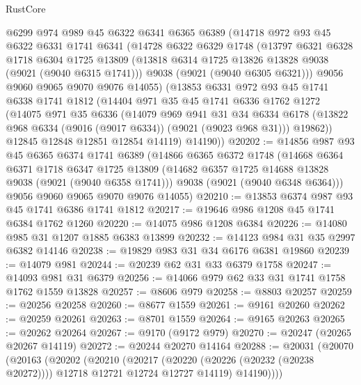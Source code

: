 \begin{lexlean}{RustCore}
\begin{coremodule}
    @6299
    @974
    @989
    @45
    @6322
    @6341
    @6365
    @6389
    (@14718
      @972
      @93
      @45
      @6322
      @6331
      @1741
      @6341
      (@14728
        @6322
        @6329
        @1748
        (@13797
          @6321
          @6328
          @1718
          @6304
          @1725
          @13809
          (@13818 @6314 @1725 @13826 @13828 @9038 (@9021 (@9040 @6315 @1741)))
          @9038
          (@9021 (@9040 @6305 @6321)))
        @9056
        @9060
        @9065
        @9070
        @9076
        @14055)
      (@13853
        @6331
        @972
        @93
        @45
        @1741
        @6338
        @1741
        @1812
        (@14404
          @971
          @35
          @45
          @1741
          @6336
          @1762
          @1272
          (@14075
            @971
            @35
            @6336
            (@14079
              @969
              @941
              @31
              @34
              @6334
              @6178
              (@13822 @968 @6334 (@9016 (@9017 @6334)) (@9021 (@9023 @968 @31)))
              @19862))
          @12845
          @12848
          @12851
          @12854
          @14119)
        @14190))
@20202 := @14856
    @987
    @93
    @45
    @6365
    @6374
    @1741
    @6389
    (@14866
      @6365
      @6372
      @1748
      (@14668
        @6364
        @6371
        @1718
        @6347
        @1725
        @13809
        (@14682 @6357 @1725 @14688 @13828 @9038 (@9021 (@9040 @6358 @1741)))
        @9038
        (@9021 (@9040 @6348 @6364)))
      @9056
      @9060
      @9065
      @9070
      @9076
      @14055)
@20210 := @13853 @6374 @987 @93 @45 @1741 @6386 @1741 @1812
@20217 := @19646 @986 @1208 @45 @1741 @6384 @1762 @1260
@20220 := @14075 @986 @1208 @6384
@20226 := @14080 @985 @31 @1207 @1885 @6383 @13899
@20232 := @14123 @984 @31 @35 @2997 @6382 @14146
@20238 := @19829 @983 @31 @34 @6176 @6381 @19860
@20239 := @14079 @981
@20244 := @20239 @62 @31 @33 @6379 @1758
@20247 := @14093 @981 @31 @6379
@20256 := @14066 @979 @62 @33 @31 @1741 @1758 @1762 @1559 @13828
@20257 := @8606 @979
@20258 := @8803 @20257
@20259 := @20256 @20258
@20260 := @8677 @1559
@20261 := @9161 @20260
@20262 := @20259 @20261
@20263 := @8701 @1559
@20264 := @9165 @20263
@20265 := @20262 @20264
@20267 := @9170 (@9172 @979)
@20270 := @20247 (@20265 @20267 @14119)
@20272 := @20244 @20270 @14164
@20288 := @20031
    (@20070
      (@20163
        (@20202
          (@20210
            (@20217 (@20220 (@20226 (@20232 (@20238 @20272)))) @12718 @12721 @12724 @12727 @14119)
            @14190))))

\end{coremodule}
\end{lexlean}
